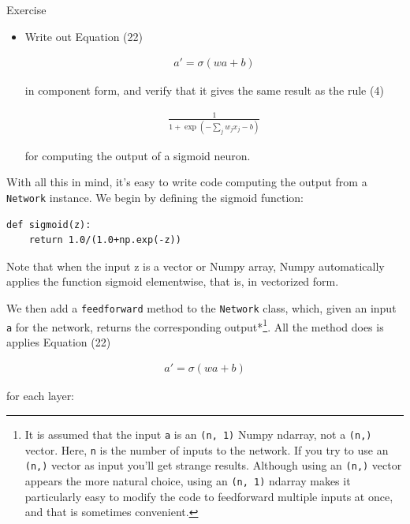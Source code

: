 \begin{exerciseBox}{Exercise}


\begin{itemize}

\item 
Write out Equation (22)


\begin{align*}
a' = \sigma(w a + b) \nonumber
\end{align*}

in component form, and verify that it gives the same result as the rule (4)


\begin{align*}
\frac{1}{1+\exp(-\sum_j w_j x_j-b)} \nonumber
\end{align*}

for computing the output of a sigmoid neuron.

\end{itemize}


With all this in mind, it's easy to write code computing the output from a \texttt{Network} instance. We begin by defining the sigmoid function:



\begin{lstlisting}
def sigmoid(z):
    return 1.0/(1.0+np.exp(-z))

\end{lstlisting}


Note that when the input z is a vector or Numpy array, Numpy automatically applies the function sigmoid elementwise, that is, in vectorized form.


We then add a \texttt{feedforward} method to the \texttt{Network} class, which, given an input \texttt{a} for the network, returns the corresponding output*\footnote{It is assumed that the input \texttt{a} is an \texttt{(n, 1)} Numpy ndarray, not a \texttt{(n,)} vector. Here, \texttt{n} is the number of inputs to the network. If you try to use an \texttt{(n,)} vector as input you'll get strange results. Although using an \texttt{(n,)} vector appears the more natural choice, using an \texttt{(n, 1)} ndarray makes it particularly easy to modify the code to feedforward multiple inputs at once, and that is sometimes convenient.}. All the method does is applies Equation (22)

\begin{align*}
a' = \sigma(w a + b) \nonumber
\end{align*}

\noindent for each layer:




\end{exerciseBox}

